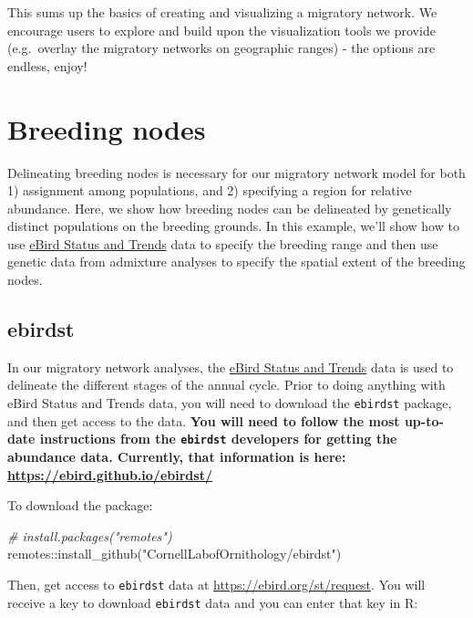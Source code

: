 \documentclass[
]{book}
\newenvironment{Shaded}{\begin{snugshade}}{\end{snugshade}}
\newcommand{\CommentTok}[1]{\textcolor[rgb]{0.56,0.35,0.01}{\textit{#1}}}
\newcommand{\FunctionTok}[1]{\textcolor[rgb]{0.00,0.00,0.00}{#1}}
\newcommand{\NormalTok}[1]{#1}
\newcommand{\SpecialCharTok}[1]{\textcolor[rgb]{0.00,0.00,0.00}{#1}}
\newcommand{\StringTok}[1]{\textcolor[rgb]{0.31,0.60,0.02}{#1}}
\begin{document}
This sums up the basics of creating and visualizing a migratory network. We encourage users to explore and build upon the visualization tools we provide (e.g.~overlay the migratory networks on geographic ranges) - the options are endless, enjoy!

\hypertarget{breeding}{%
\chapter{Breeding nodes}\label{breeding}}

Delineating breeding nodes is necessary for our migratory network model for both 1) assignment among populations, and 2) specifying a region for relative abundance. Here, we show how breeding nodes can be delineated by genetically distinct populations on the breeding grounds. In this example, we'll show how to use \href{https://ebird.org/science/status-and-trends}{eBird Status and Trends} data to specify the breeding range and then use genetic data from admixture analyses to specify the spatial extent of the breeding nodes.

\hypertarget{ebirdst}{%
\section{ebirdst}\label{ebirdst}}

In our migratory network analyses, the \href{https://science.ebird.org/en/status-and-trends}{eBird Status and Trends} data is used to delineate the different stages of the annual cycle. Prior to doing anything with eBird Status and Trends data, you will need to download the \texttt{ebirdst} package, and then get access to the data. \textbf{You will need to follow the most up-to-date instructions from the \texttt{ebirdst} developers for getting the abundance data. Currently, that information is here: \url{https://ebird.github.io/ebirdst/}}

To download the package:

\begin{Shaded}
\begin{Highlighting}[]
\CommentTok{\# install.packages("remotes")}
\NormalTok{remotes}\SpecialCharTok{::}\FunctionTok{install\_github}\NormalTok{(}\StringTok{"CornellLabofOrnithology/ebirdst"}\NormalTok{)}
\end{Highlighting}
\end{Shaded}

Then, get access to \texttt{ebirdst} data at \url{https://ebird.org/st/request}. You will receive a key to download \texttt{ebirdst} data and you can enter that key in R:
\end{document}

